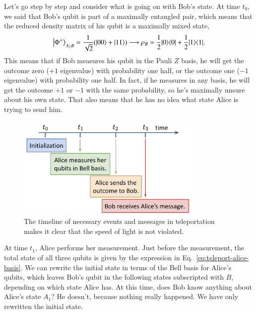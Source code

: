 Let's go step by step and consider what is going on with Bob's state. At time $t_0$, we said that Bob's qubit is part of a maximally entangled pair, which means that the reduced density matrix of his qubit is a maximally mixed state,
\begin{equation}
\left|\Phi^{+}\right\rangle_{A_2 B}=\frac{1}{\sqrt{2}}(|00\rangle+|11\rangle) \longrightarrow \rho_B=\frac{1}{2}|0 \rangle \langle 0| +\frac{1}{2}|1 \rangle \langle 1|.
\end{equation}
This means that if Bob measures his qubit in the Pauli $Z$ basis, he will get the outcome zero ($+1$ eigenvalue) with probability one half, or the outcome one ($-1$ eigenvalue) with probability one half. In fact, if he measures in any basis, he will get the outcome $+1$ or $-1$ with the same probability, so he's maximally unsure about his own state. That also means that he has no idea what state Alice is trying to send him.
\begin{figure}[H]
    \centering
    \includegraphics[width=0.8\textwidth]{lesson8/teleportation-timeline.png}
        \caption{The timeline of necessary events and messages in teleportation makes it clear that the speed of light is not violated.}
    \label{fig:teleportation-timeline}
\end{figure}

At time $t_1$, Alice performs her measurement. Just before the measurement, the total state of all three qubits is given by the expression in Eq.~\ref{eq:teleport-alice-basis}. We can rewrite the initial state in terms of the Bell basis for Alice's qubits, which leaves Bob's qubit in the following states subscripted with $B$, depending on which state Alice has. At this time, does Bob know anything about Alice's state $A_1$? He doesn't, because nothing really happened. We have only rewritten the initial state.

